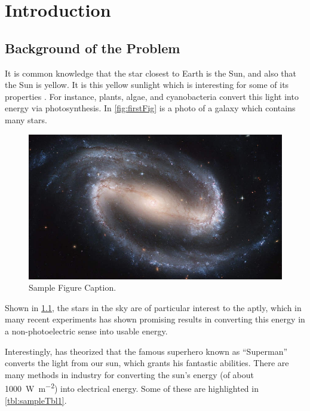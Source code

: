 
\chapter{Introduction}
\begin{refsection}
\section{Background of the Problem}

It is common knowledge that the star closest to Earth is the Sun, and also that the Sun is yellow. It is this yellow sunlight which is interesting for some of its properties \cite{onate_exploring_2021}. For instance, plants, algae, and cyanobacteria convert this light into energy via photosynthesis. In \ref{fig:firstFig} is a photo of a galaxy which contains many stars.\cite{wikipediaCentralBikol}

\begin{figure}[h!]
	\centering 
	\includegraphics[width=\textwidth]{figures/sampleFig1.jpg} 
	\caption{Sample Figure Caption.}
	\label{FigureLabel}
\end{figure}

Shown in \ref{FigureLabel}, the stars in the sky are of particular interest to the aptly, which in many recent experiments has shown promising results in converting this energy in a non-photoelectric sense into usable energy. 

Interestingly, has theorized that the famous superhero known as ``Superman'' converts the light from our sun, which grants his fantastic abilities. There are many methods in industry for converting the sun's energy (of about \SI{1000}{\watt\per\meter\squared}) into electrical energy. Some of these are highlighted in \ref{tbl:sampleTbl1}.

\begin{table}[ht]
\centering
\caption{This is a table}
\label{tbl:sampleTbl1}
\end{table}


\end{refsection}
